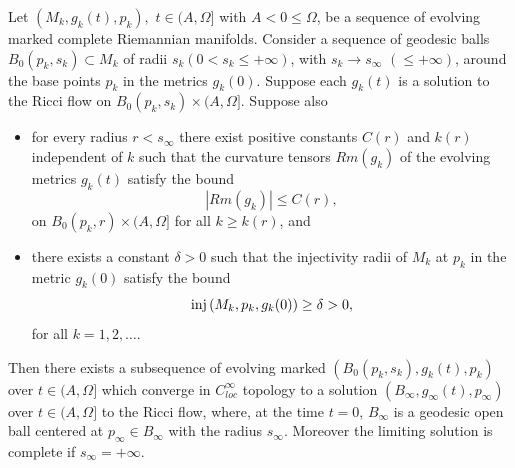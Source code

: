 \begin{theorem}
  \label{thm:cz-hamilton-compactness-for-ricci-flows}
Let $(M_k,g_k(t),p_k),$ $t\in(A,\Omega]$ with $A<0 \leq \Omega$,
be a sequence of evolving marked complete Riemannian manifolds.
Consider a sequence of geodesic balls $B_0(p_k,s_k) \subset M_k$
of radii $s_k (0<s_k \leq +{\infty})$, with $s_k \rightarrow
s_{\infty}$ $(\leq +{\infty})$, around the base points $p_k$ in
the metrics $g_k(0)$. Suppose each $g_k(t)$ is a solution to the
Ricci flow on $B_0(p_k,s_k) \times (A,\Omega]$. Suppose also
\begin{itemize}
\item[(i)] for every radius $r<s_{\infty}$ there exist positive
constants $C(r)$ and $k(r)$ independent of $k$ such that the
curvature tensors $Rm(g_k)$ of the evolving metrics $g_k(t)$
satisfy the bound
$$
|Rm(g_k)|\leq C(r),
$$
on $B_0(p_k,r) \times (A,\Omega]$ for all $k \geq k(r)$, and
\item[(ii)] there exists a constant $\delta > 0$ such that the
injectivity radii of $M_k$ at $p_k$ in the metric $g_k(0)$ satisfy
the bound
$$
{\rm inj}\,(M_k,p_k,g_k(0))\geq\delta>0,
$$
for all $k = 1, 2, \ldots$.
\end{itemize}
Then there exists a subsequence of evolving marked
$(B_0(p_k,s_k),g_k(t),p_k)$ over $t \in (A,\Omega]$ which converge
in $C^\infty_{loc}$ topology to a solution
$(B_{\infty},g_{\infty}(t),p_{\infty})$ over $t \in (A,\Omega]$ to
the Ricci flow, where, at the time $t=0$, $B_{\infty}$ is a
geodesic open ball centered at $p_{\infty}\in B_{\infty}$ with the
radius $s_{\infty}$. Moreover the limiting solution is complete if
$s_{\infty}=+\infty$.
\end{theorem}
